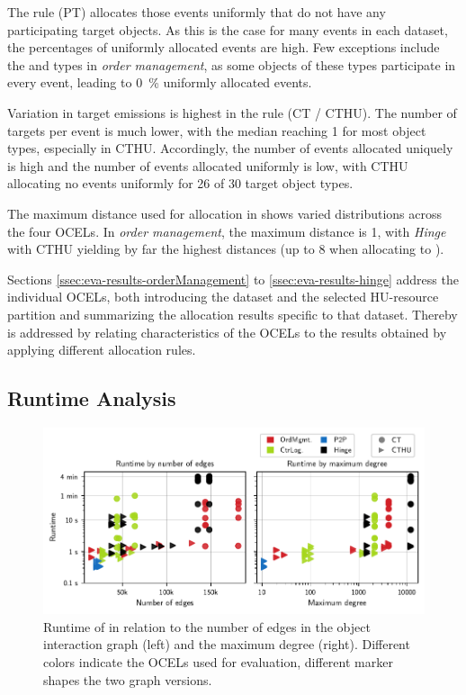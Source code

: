 The  rule (PT) allocates those events uniformly that do not have any participating target objects. As this is the case for many events in each dataset, the percentages of uniformly allocated events are high. Few exceptions include the  and  types in \textit{order management}, as some objects of these types participate in every event, leading to \qty{0}{\percent} uniformly allocated events.

Variation in target emissions is highest in the  rule (CT / CTHU). The number of targets per event is much lower, with the median reaching 1 for most object types, especially in CTHU. Accordingly, the number of events allocated uniquely is high and the number of events allocated uniformly is low, with CTHU allocating no events uniformly for 26 of 30 target object types.

The maximum distance used for allocation in  shows varied distributions across the four OCELs. In \textit{order management}, the maximum distance is 1, with \textit{Hinge} with CTHU yielding by far the highest distances (up to 8 when allocating to ).

Sections \ref{ssec:eva-results-orderManagement} to \ref{ssec:eva-results-hinge} address the individual OCELs, both introducing the dataset and the selected HU-resource partition and summarizing the allocation results specific to that dataset. Thereby \RQsix is addressed by relating characteristics of the OCELs to the results obtained by applying different allocation rules.

\subsection*{Runtime Analysis}
\label{sec:eva-results-runtime}

\begin{figure}[t]
  \centering
  \includegraphics[width=\textwidth]{figures/20240910-175043-eva-scatter-edges-degree-runtime-61c1c0ba.pdf}
  \caption{Runtime of  in relation to the number of edges in the object interaction graph (left) and the maximum degree (right). Different colors indicate the OCELs used for evaluation, different marker shapes the two graph versions.}
  \label{fig:eva-scatter-edges-degree-runtime}
\end{figure}

